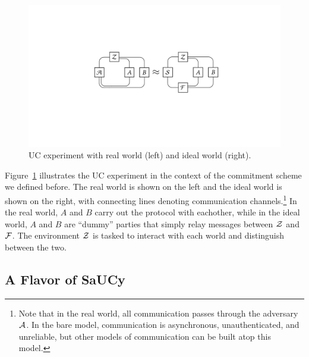 \begin{figure}
  \centering
  \includegraphics[width=0.85\linewidth]{graphics/suc-experiment}
  \caption{UC experiment with real world (left) and ideal world (right).}
  \label{fig:uc-experiment}
\end{figure}

Figure~\ref{fig:uc-experiment} illustrates the UC experiment in the context of
the commitment scheme we defined before. The real world is shown on the left and
the ideal world is shown on the right, with connecting lines denoting
communication channels.\footnote{Note that in the real world, all communication
  passes through the adversary $\mathcal{{A}}$. In the bare model, communication is
  asynchronous, unauthenticated, and unreliable, but other models of
  communication can be built atop this model.} In the real world, $A$ and $B$
carry out the protocol with eachother, while in the ideal world, $A$ and $B$ are
``dummy'' parties that simply relay messages between $\mathcal{{Z}}$ and $\mathcal{{F}}$. The
environment $\mathcal{{Z}}$ is tasked to interact with each world and distinguish
between the two.

\subsection{A Flavor of SaUCy}
\label{subsec:sauce-flavored}




